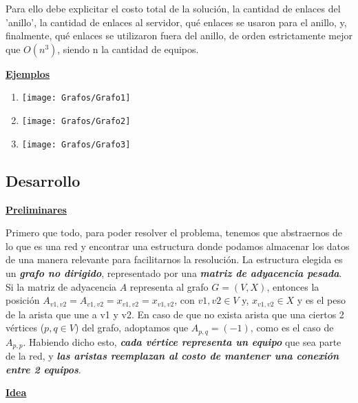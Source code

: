 Para ello debe explicitar el costo total de la solución, la cantidad de enlaces del 'anillo', la cantidad de enlaces al servidor, qué enlaces se usaron para el anillo,  y, finalmente, qué enlaces se utilizaron fuera del anillo, de orden estrictamente mejor que $O(n^3)$, siendo n la cantidad de equipos.

\noindent \textbf{\underline{Ejemplos}}
\begin{enumerate}
\item \texttt{[image: Grafos/Grafo1]}
\newline
\newline
\item \texttt{[image: Grafos/Grafo2]}
\newline
\newline
\item \texttt{[image: Grafos/Grafo3]}
\end{enumerate}

\newpage
\subsection{Desarrollo}

\noindent \textbf{\underline{Preliminares}}

Primero que todo, para poder resolver el problema, tenemos que abstraernos de lo que es una red y encontrar una estructura donde podamos almacenar los datos de una manera relevante para facilitarnos la resolución. La estructura elegida es un \textbf{\textit{grafo no dirigido}}, representado por una \textbf{\textit{matriz de adyacencia pesada}}. Si la matriz de adyacencia $A$ representa al grafo $G = (V,X)$, entonces la posición $A_{v1,v2} = A_{v1,v2} = x_{v1,v2} = x_{v1,v2}$, con $v1,v2 \in V$ y, $x_{v1,v2} \in X$ y es el peso de la arista que une a v1 y v2. En caso de que no exista arista que una ciertos 2 vértices ($p,q \in V$) del grafo, adoptamos que $A_{p,q} = (-1)$, como es el caso de $A_{p,p}$. Habiendo dicho esto, \textbf{\textit{cada vértice representa un equipo}} que sea parte de la red, y \textbf{\textit{las aristas reemplazan al costo de mantener una conexión entre 2 equipos}}.

\noindent \textbf{\underline{Idea}}

